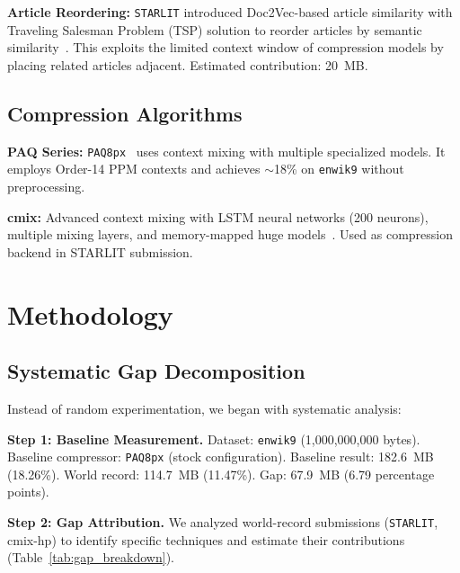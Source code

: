 \documentclass[conference]{IEEEtran}
\newcommand{\enwik}{{\tt enwik9}}
\newcommand{\paqpx}{{\tt PAQ8px}}
\newcommand{\starlit}{{\tt STARLIT}}
\begin{document}
\textbf{Article Reordering:} \starlit{} introduced Doc2Vec-based article similarity with Traveling Salesman Problem (TSP) solution to reorder articles by semantic similarity~\cite{margaritov2021starlit}. This exploits the limited context window of compression models by placing related articles adjacent. Estimated contribution: 20~MB.

\subsection{Compression Algorithms}

\textbf{PAQ Series:} \paqpx~\cite{matyaspaq8px} uses context mixing with multiple specialized models. It employs Order-14 PPM contexts and achieves $\sim$18\% on \enwik{} without preprocessing.

\textbf{cmix:} Advanced context mixing with LSTM neural networks (200 neurons), multiple mixing layers, and memory-mapped huge models~\cite{knoll2016cmix}. Used as compression backend in STARLIT submission.

\section{Methodology}

\subsection{Systematic Gap Decomposition}

Instead of random experimentation, we began with systematic analysis:

\textbf{Step 1: Baseline Measurement.} Dataset: \enwik{} (1,000,000,000 bytes). Baseline compressor: \paqpx{} (stock configuration). Baseline result: 182.6~MB (18.26\%). World record: 114.7~MB (11.47\%). Gap: 67.9~MB (6.79 percentage points).

\textbf{Step 2: Gap Attribution.} We analyzed world-record submissions (\starlit, cmix-hp) to identify specific techniques and estimate their contributions (Table~\ref{tab:gap_breakdown}).
\end{document}

